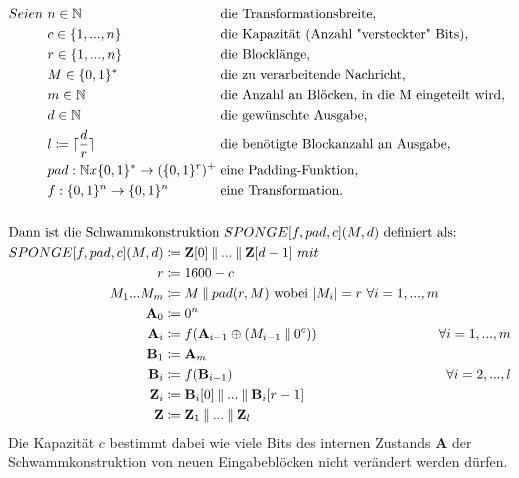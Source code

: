 \begin{align*}
    &\begin{alignedat}[t]{2}
        Seien\ & n \in \mathbb{N} && \text{ die Transformationsbreite}, \\
        & c \in \{1,...,n\} && \text{ die Kapazität (Anzahl "versteckter" Bits)}, \\
        & r \in \{1,...,n\} && \text{ die Blocklänge}, \\
        & M \in \{0,1\}^* && \text{ die zu verarbeitende Nachricht}, \\
        & m \in \mathbb{N} && \text{ die Anzahl an Blöcken, in die M eingeteilt wird}, \\
        & d \in \mathbb{N} && \text{ die gewünschte Ausgabe}, \\
        & l \coloneq \lceil \frac{d}{r} \rceil && \text{ die benötigte Blockanzahl an Ausgabe}, \\
        & pad: \mathbb{N}x\{0,1\}^* \to (\{0,1\}^r)^+ && \text{ eine Padding-Funktion}, \\
        & f: \{0,1\}^n \to \{0,1\}^n && \text{ eine Transformation}.
    \end{alignedat} \\
    \\
    &\text{Dann ist die Schwammkonstruktion } SPONGE[f,pad,c](M,d) \text{ definiert als:} \\
    &\begin{alignedat}[t]{3}
        SPONGE[f,pad,c](M, d) & \coloneq \mathbf{Z}[0] \mathbin\Vert ... \mathbin\Vert \mathbf{Z}[d-1]\ mit \\
        r & \coloneq 1600 - c \\
        M_1...M_{m} & \coloneq M \mathbin\Vert pad(r, M) \text{ wobei } |M_i| = r\ \forall i = 1,...,m\\
        \mathbf{A}_0 & \coloneq 0^n \\
        \mathbf{A}_i & \coloneq f(\mathbf{A}_{i-1} \oplus (M_{i-1} \mathbin\Vert 0^c))\ & \forall i = 1,...,m \\
        \mathbf{B}_1 & \coloneq \mathbf{A}_{m} \\
        \mathbf{B}_i & \coloneq f(\mathbf{B}_{i-1})\ & \forall i = 2,...,l \\
        \mathbf{Z}_i & \coloneq \mathbf{B}_i[0] \mathbin\Vert ... \mathbin\Vert \mathbf{B}_i[r-1] \\
        \mathbf{Z} & \coloneq \mathbf{Z}_1 \mathbin\Vert ... \mathbin\Vert \mathbf{Z}_l
    \end{alignedat}
\end{align*}
Die Kapazität $c$ bestimmt dabei wie viele Bits des internen Zustands $\mathbf{A}$ der Schwammkonstruktion von neuen Eingabeblöcken
nicht verändert werden dürfen. 
	
